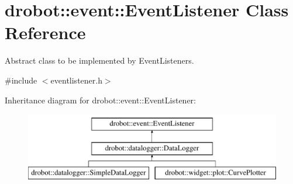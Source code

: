 \hypertarget{classdrobot_1_1event_1_1EventListener}{\section{drobot\-:\-:event\-:\-:Event\-Listener Class Reference}
\label{classdrobot_1_1event_1_1EventListener}
}


Abstract class to be implemented by Event\-Listeners.  




{\ttfamily \#include $<$eventlistener.\-h$>$}

Inheritance diagram for drobot\-:\-:event\-:\-:Event\-Listener\-:\begin{figure}[H]
\begin{center}
\leavevmode
\includegraphics[height=3.000000cm]{classdrobot_1_1event_1_1EventListener}
\end{center}
\end{figure}
